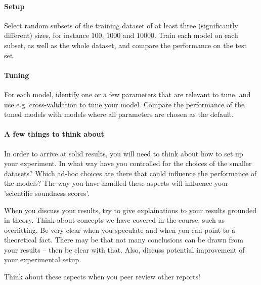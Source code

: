 \documentclass{article}
\begin{document}
\paragraph{Setup} Select random subsets of the training dataset of at least three (significantly different) sizes, for instance $100$, $1000$ and $10000$. Train each model on each subset, as well as the whole dataset, and compare the performance on the test set. 

\paragraph{Tuning} For each model, identify one or a few parameters that are relevant to tune, and use e.g. cross-validation to tune your model. Compare the performance of the tuned models with models where all parameters are chosen as the default. 

\paragraph{A few things to think about} In order to arrive at solid results, you will need to think about how to set up your experiment. In what way have you controlled for the choices of the smaller datasets? Which ad-hoc choices are there that could influence the performance of the models? The way you have handled these aspects will influence your 'scientific soundness scores'. 

When you discuss your results, try to give explainations to your results grounded in theory. Think about concepts we have covered in the course, such as overfitting. Be very clear when you speculate and when you can point to a theoretical fact. There may be that not many conclusions can be drawn from your results -- then be clear with that. Also, discuss potential improvement of your experimental setup. 

Think about these aspects when you peer review other reports!
\end{document}
